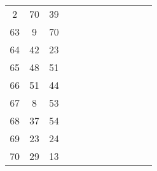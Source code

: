 \begin{table}[tb]
\begin{tabular}{|c|c|c|lllllllll}
	2  & 70 & 39 &                         &                         &                         &                         &                         &                         &                         &                         &                         \\ \cline{1-3}
	63 & 9  & 70 &                         &                         &                         &                         &                         &                         &                         &                         &                         \\ \cline{1-3}
	64 & 42 & 23 &                         &                         &                         &                         &                         &                         &                         &                         &                         \\ \cline{1-3}
	65 & 48 & 51 &                         &                         &                         &                         &                         &                         &                         &                         &                         \\ \cline{1-3}
	66 & 51 & 44 &                         &                         &                         &                         &                         &                         &                         &                         &                         \\ \cline{1-3}
	67 & 8  & 53 &                         &                         &                         &                         &                         &                         &                         &                         &                         \\ \cline{1-3}
	68 & 37 & 54 &                         &                         &                         &                         &                         &                         &                         &                         &                         \\ \cline{1-3}
	69 & 23 & 24 &                         &                         &                         &                         &                         &                         &                         &                         &                         \\ \cline{1-3}
	70 & 29 & 13 &                         &                         &                         &                         &                         &                         &                         &                         &                         \\ \cline{1-3}

\end{tabular}
\end{table}
